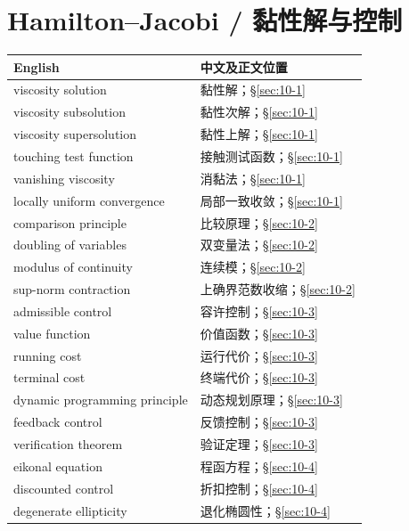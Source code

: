 \section*{Hamilton--Jacobi / 黏性解与控制}
\begin{center}\small
\begin{tabular}{@{}p{.53\linewidth}p{.38\linewidth}@{}}
\textbf{English}&\textbf{中文及正文位置}\\\hline
viscosity solution & 黏性解；\S\ref{sec:10-1}\\
viscosity subsolution & 黏性次解；\S\ref{sec:10-1}\\
viscosity supersolution & 黏性上解；\S\ref{sec:10-1}\\
touching test function & 接触测试函数；\S\ref{sec:10-1}\\
vanishing viscosity & 消黏法；\S\ref{sec:10-1}\\
locally uniform convergence & 局部一致收敛；\S\ref{sec:10-1}\\
comparison principle & 比较原理；\S\ref{sec:10-2}\\
doubling of variables & 双变量法；\S\ref{sec:10-2}\\
modulus of continuity & 连续模；\S\ref{sec:10-2}\\
sup-norm contraction & 上确界范数收缩；\S\ref{sec:10-2}\\
admissible control & 容许控制；\S\ref{sec:10-3}\\
value function & 价值函数；\S\ref{sec:10-3}\\
running cost & 运行代价；\S\ref{sec:10-3}\\
terminal cost & 终端代价；\S\ref{sec:10-3}\\
dynamic programming principle & 动态规划原理；\S\ref{sec:10-3}\\
feedback control & 反馈控制；\S\ref{sec:10-3}\\
verification theorem & 验证定理；\S\ref{sec:10-3}\\
eikonal equation & 程函方程；\S\ref{sec:10-4}\\
discounted control & 折扣控制；\S\ref{sec:10-4}\\
degenerate ellipticity & 退化椭圆性；\S\ref{sec:10-4}
\end{tabular}
\end{center}
\clearpage
